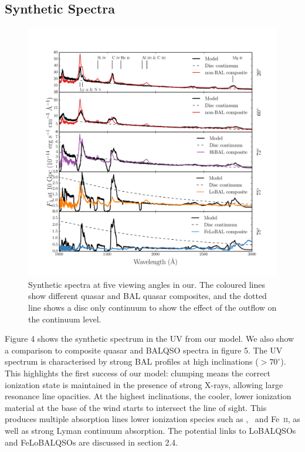 \documentclass[preprint, a4paper, 11pt]{aastex}
\begin{document}
\subsection{Synthetic Spectra}

\begin{figure} %
\centering
\includegraphics[width=1.0\textwidth]{figures/uvspec.png}
\caption
{
Synthetic spectra at five viewing angles in our. The coloured lines
show different quasar and BAL quasar composites, and the dotted line shows a disc
only continuum to show the effect of the outflow on the continuum level.
}
\label{fig:uvspec}
\end{figure} %




Figure 4 shows the synthetic spectrum in the UV from our model. 
We also show a comparison
to composite quasar and BALQSO spectra in figure 5.
The UV spectrum is characterised by strong BAL 
profiles at high inclinations ($> 70^\circ$). 
This highlights the first success of our model: 
clumping means the correct ionization state 
is maintained in the presence of strong X-rays, 
allowing large resonance line opacities. 
At the highest inclinations, the 
cooler, lower ionization material at the base of the wind
starts to intersect the line of sight. This produces 
multiple absorption lines lower ionization species such as \mg,
\al\ and Fe~\textsc{ii}, as well as strong Lyman continuum absorption.
The potential links to LoBALQSOs and FeLoBALQSOs are discussed in section 2.4.
\end{document}
